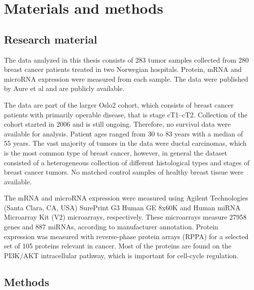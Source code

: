 

\section{Materials and methods}\label{materials-and-methods}

\subsection{Research material}

The data analyzed in this thesis consists of 283 tumor samples collected from
280 breast cancer patients treated in two Norwegian hospitals. Protein, mRNA
and microRNA expression were measured from each sample. The data were
published by Aure et al \citep{Aure2015} and are publicly available.

The data are part of the larger Oslo2 cohort, which consists of breast cancer
patients with primarily operable disease, that is stage cT1--cT2. Collection
of the cohort started in 2006 and is still ongoing. Therefore, no survival
data were available for analysis. 
Patient ages ranged from 30 to 83 years with a median of 55 years. The vast
majority of tumors in the data were ductal carcinomas, which is the most
common type of breast cancer, however, in general the dataset consisted of a
heterogeneous collection of different histological types and stages of breast
cancer tumors. No matched control samples of healthy breast tissue were
available.

%

The mRNA and microRNA expression were measured using Agilent Technologies (Santa Clara, CA, USA)
SurePrint G3 Human GE 8x60K and Human miRNA Microarray Kit (V2) microarrays,
respectively. These microarrays measure 27958 genes and 887 miRNAs, according
to manufacturer annotation. Protein expression was measured with reverse-phase
protein arrays (RPPA) \citep{Tibes2006} for a selected set of 105 proteins relevant in
cancer. Most of the proteins are found on the PI3K/AKT intracellular pathway,
which is important for cell-cycle regulation.




\subsection{Methods}

